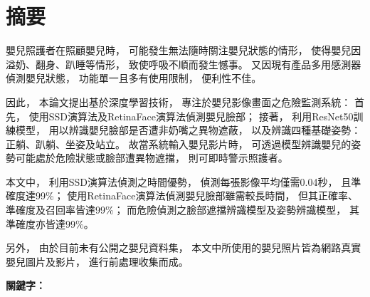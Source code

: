 \documentclass[class=NCU_thesis, crop=false]{standalone}
\begin{document}
\chapter{摘要}
嬰兒照護者在照顧嬰兒時，
可能發生無法隨時關注嬰兒狀態的情形，
使得嬰兒因溢奶、翻身、趴睡等情形，
致使呼吸不順而發生憾事。
又因現有產品多用感測器偵測嬰兒狀態，
功能單一且多有使用限制，
便利性不佳。

因此，
本論文提出基於深度學習技術，
專注於嬰兒影像畫面之危險監測系統：
首先，
使用SSD演算法及RetinaFace演算法偵測嬰兒臉部；
接著，
利用ResNet50訓練模型，
用以辨識嬰兒臉部是否遭非奶嘴之異物遮蔽，
以及辨識四種基礎姿勢：正躺、趴躺、坐姿及站立。
故當系統輸入嬰兒影片時，
可透過模型辨識嬰兒的姿勢可能處於危險狀態或臉部遭異物遮擋，
則可即時警示照護者。

本文中，
利用SSD演算法偵測之時間優勢，
偵測每張影像平均僅需0.04秒，
且準確度達99\%；
使用RetinaFace演算法偵測嬰兒臉部雖需較長時間，
但其正確率、準確度及召回率皆達99\%；
而危險偵測之臉部遮擋辨識模型及姿勢辨識模型，
其準確度亦皆達99\%。

另外，
由於目前未有公開之嬰兒資料集，
本文中所使用的嬰兒照片皆為網路真實嬰兒圖片及影片，
進行前處理收集而成。

\vspace{2em}
\noindent \textbf{關鍵字：} \keywordsZh{} %
\end{document}
